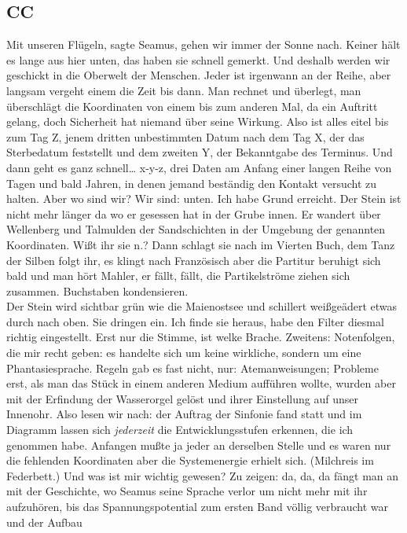\documentclass[
]{article}
\author{}
\date{\vspace{-2.5em}}
\begin{document}
\subsection{CC}\label{cc}

Mit unseren Flügeln, sagte Seamus, gehen wir immer der Sonne nach.
Keiner hält es lange aus hier unten, das haben sie schnell gemerkt. Und
deshalb werden wir geschickt in die Oberwelt der Menschen. Jeder ist
irgenwann an der Reihe, aber langsam vergeht einem die Zeit bis dann.
Man rechnet und überlegt, man überschlägt die Koordinaten von einem bis
zum anderen Mal, da ein Auftritt gelang, doch Sicherheit hat niemand
über seine Wirkung. Also ist alles eitel bis zum Tag Z, jenem dritten
unbestimmten Datum nach dem Tag X, der das Sterbedatum feststellt und
dem zweiten Y, der Bekanntgabe des Terminus. Und dann geht es ganz
schnell\ldots{} x-y-z, drei Daten am Anfang einer langen Reihe von Tagen
und bald Jahren, in denen jemand beständig den Kontakt versucht zu
halten. Aber wo sind wir? Wir sind: unten. Ich habe Grund erreicht. Der
Stein ist nicht mehr länger da wo er gesessen hat in der Grube innen. Er
wandert über Wellenberg und Talmulden der Sandschichten in der Umgebung
der genannten Koordinaten. Wißt ihr sie n.? Dann schlagt sie nach im
Vierten Buch, dem Tanz der Silben folgt ihr, es klingt nach Französisch
aber die Partitur beruhigt sich bald und man hört Mahler, er fällt,
fällt, die Partikelströme ziehen sich zusammen. Buchstaben
kondensieren.\\
Der Stein wird sichtbar grün wie die Maienostsee und schillert
weißgeädert etwas durch nach oben. Sie dringen ein. Ich finde sie
heraus, habe den Filter diesmal richtig eingestellt. Erst nur die
Stimme, ist welke Brache. Zweitens: Notenfolgen, die mir recht geben: es
handelte sich um keine wirkliche, sondern um eine Phantasiesprache.
Regeln gab es fast nicht, nur: Atemanweisungen; Probleme erst, als man
das Stück in einem anderen Medium aufführen wollte, wurden aber mit der
Erfindung der Wasserorgel gelöst und ihrer Einstellung auf unser
Innenohr. Also lesen wir nach: der Auftrag der Sinfonie fand statt und
im Diagramm lassen sich \emph{jederzeit} die Entwicklungsstufen
erkennen, die ich genommen habe. Anfangen mußte ja jeder an derselben
Stelle und es waren nur die fehlenden Koordinaten aber die Systemenergie
erhielt sich. (Milchreis im Federbett.) Und was ist mir wichtig gewesen?
Zu zeigen: da, da, da fängt man an mit der Geschichte, wo Seamus seine
Sprache verlor um nicht mehr mit ihr aufzuhören, bis das
Spannungspotential zum ersten Band völlig verbraucht war und der Aufbau
\end{document}
